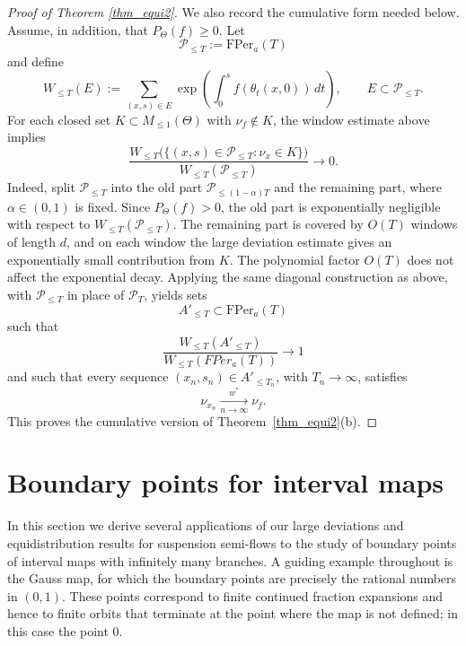 \documentclass[letterpaper,11pt]{amsart}
\numberwithin{equation}{section}     %
\def\le{\leqslant}
\def\ge{\geqslant}
\begin{document}
\begin{proof}[Proof of Theorem \ref{thm_equi2}]
We also record the cumulative form needed below. Assume, in addition, that
$P_\Theta(f)\ge 0$.  Let
\[
        \mathcal P_{\le T}:=\text{FPer}_a(T)
\]
and define
\[
        W_{\le T}(E):=
        \sum_{(x,s)\in E}
        \exp\left(\int_0^s f(\theta_t(x,0))\,dt\right),
        \qquad E\subset \mathcal P_{\le T}.
\]
For each closed set $K\subset M_{\le1}(\Theta)$ with $\nu_f\notin K$, the
window estimate above implies
\[
 \frac{
 W_{\le T}\bigl(\{(x,s)\in \mathcal P_{\le T}:\nu_x\in K\}\bigr)
 }{
 W_{\le T}(\mathcal P_{\le T})
 }
 \longrightarrow 0 .
\]
Indeed, split $\mathcal P_{\le T}$ into the old part
$\mathcal P_{\le (1-\alpha)T}$ and the remaining part, where
$\alpha\in(0,1)$ is fixed.  Since $P_\Theta(f)>0$, the old part is
exponentially negligible with respect to $W_{\le T}(\mathcal P_{\le T})$.
The remaining part is covered by $O(T)$ windows of length $d$, and on each
window the large deviation estimate gives an exponentially small contribution
from $K$.  The polynomial factor $O(T)$ does not affect the exponential
decay.  Applying the same diagonal construction as above, with
$\mathcal P_{\le T}$ in place of $\mathcal P_T$, yields sets
\[
        A'_{\le T}\subset \text{FPer}_a(T)
\]
such that
\[
        \frac{W_{\le T}(A'_{\le T})}{W_{\le T}(FPer_a(T))}\longrightarrow 1
\]
and such that every sequence $(x_n,s_n)\in A'_{\le T_n}$, with $T_n\to\infty$,
satisfies
\[
        \nu_{x_n}\xrightarrow[n\to\infty]{w^*}\nu_f .
\]
This proves the cumulative version of Theorem~\ref{thm_equi2}(b).
\end{proof}


\section{Boundary points for interval maps} \label{sec:interval}


In this section we derive several applications of our large deviations and equidistribution results for suspension semi-flows to the study of boundary points of interval maps with infinitely many branches. A guiding example throughout is the Gauss map, for which the boundary points are precisely the rational numbers in $(0,1)$. These points correspond to finite continued fraction expansions and hence to finite orbits that terminate at the point where the map is not defined; in this case the point $0$.
\end{document}
